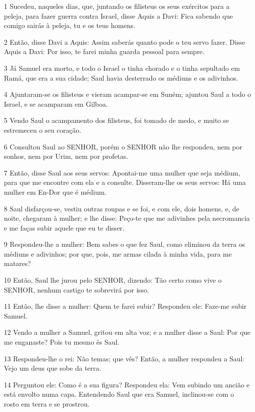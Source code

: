 \par 1 Sucedeu, naqueles dias, que, juntando os filisteus os seus exércitos para a peleja, para fazer guerra contra Israel, disse Aquis a Davi: Fica sabendo que comigo sairás à peleja, tu e os teus homens.
\par 2 Então, disse Davi a Aquis: Assim saberás quanto pode o teu servo fazer. Disse Aquis a Davi: Por isso, te farei minha guarda pessoal para sempre.
\par 3 Já Samuel era morto, e todo o Israel o tinha chorado e o tinha sepultado em Ramá, que era a sua cidade; Saul havia desterrado os médiuns e os adivinhos.
\par 4 Ajuntaram-se os filisteus e vieram acampar-se em Suném; ajuntou Saul a todo o Israel, e se acamparam em Gilboa.
\par 5 Vendo Saul o acampamento dos filisteus, foi tomado de medo, e muito se estremeceu o seu coração.
\par 6 Consultou Saul ao SENHOR, porém o SENHOR não lhe respondeu, nem por sonhos, nem por Urim, nem por profetas.
\par 7 Então, disse Saul aos seus servos: Apontai-me uma mulher que seja médium, para que me encontre com ela e a consulte. Disseram-lhe os seus servos: Há uma mulher em En-Dor que é médium.
\par 8 Saul disfarçou-se, vestiu outras roupas e se foi, e com ele, dois homens, e, de noite, chegaram à mulher; e lhe disse: Peço-te que me adivinhes pela necromancia e me faças subir aquele que eu te disser.
\par 9 Respondeu-lhe a mulher: Bem sabes o que fez Saul, como eliminou da terra os médiuns e adivinhos; por que, pois, me armas cilada à minha vida, para me matares?
\par 10 Então, Saul lhe jurou pelo SENHOR, dizendo: Tão certo como vive o SENHOR, nenhum castigo te sobrevirá por isso.
\par 11 Então, lhe disse a mulher: Quem te farei subir? Respondeu ele: Faze-me subir Samuel.
\par 12 Vendo a mulher a Samuel, gritou em alta voz; e a mulher disse a Saul: Por que me enganaste? Pois tu mesmo és Saul.
\par 13 Respondeu-lhe o rei: Não temas; que vês? Então, a mulher respondeu a Saul: Vejo um deus que sobe da terra.
\par 14 Perguntou ele: Como é a sua figura? Respondeu ela: Vem subindo um ancião e está envolto numa capa. Entendendo Saul que era Samuel, inclinou-se com o rosto em terra e se prostrou.
